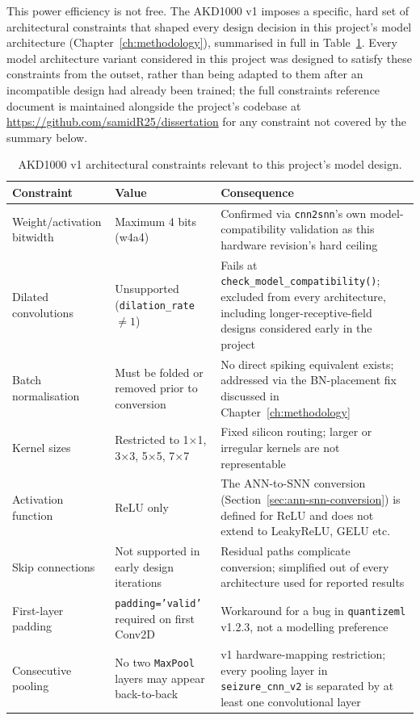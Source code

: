 This power efficiency is not free. The AKD1000 v1 imposes a specific, hard set of architectural constraints that shaped every design decision in this project's model architecture (Chapter~\ref{ch:methodology}), summarised in full in Table~\ref{tab:akd1000-constraints}. Every model architecture variant considered in this project was designed to satisfy these constraints from the outset, rather than being adapted to them after an incompatible design had already been trained; the full constraints reference document is maintained alongside the project's codebase at \url{https://github.com/samidR25/dissertation} for any constraint not covered by the summary below.

\begin{table}[H]
\centering
\caption{AKD1000 v1 architectural constraints relevant to this project's model design.}
\label{tab:akd1000-constraints}
\begin{tabular}{p{4cm}p{5cm}p{4.5cm}}
\toprule
Constraint & Value & Consequence \\
\midrule
Weight/activation bitwidth & Maximum 4 bits (w4a4) & Confirmed via \texttt{cnn2snn}'s own model-compatibility validation as this hardware revision's hard ceiling \\
\midrule
Dilated convolutions & Unsupported (\texttt{dilation\_rate} $\neq 1$) & Fails at \texttt{check\_model\_compatibility()}; excluded from every architecture, including longer-receptive-field designs considered early in the project \\
\midrule
Batch normalisation & Must be folded or removed prior to conversion & No direct spiking equivalent exists; addressed via the BN-placement fix discussed in Chapter~\ref{ch:methodology} \\
\midrule
Kernel sizes & Restricted to 1$\times$1, 3$\times$3, 5$\times$5, 7$\times$7 & Fixed silicon routing; larger or irregular kernels are not representable \\
\midrule
Activation function & ReLU only & The ANN-to-SNN conversion (Section~\ref{sec:ann-snn-conversion}) is defined for ReLU and does not extend to LeakyReLU, GELU etc. \\
\midrule
Skip connections & Not supported in early design iterations & Residual paths complicate conversion; simplified out of every architecture used for reported results \\
\midrule
First-layer padding & \texttt{padding='valid'} required on first Conv2D & Workaround for a bug in \texttt{quantizeml} v1.2.3, not a modelling preference \\
\midrule
Consecutive pooling & No two \texttt{MaxPool} layers may appear back-to-back & v1 hardware-mapping restriction; every pooling layer in \texttt{seizure\_cnn\_v2} is separated by at least one convolutional layer \\
\bottomrule
\end{tabular}
\end{table}

